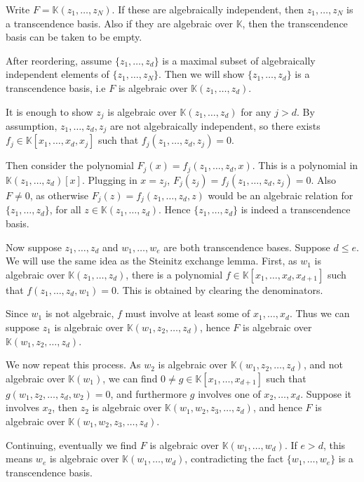 \documentclass[12pt]{article}
\begin{document}
\begin{proofbox}
	Write $F = \mathbb{K}(z_1, \ldots, z_N)$. If these are algebraically independent, then $z_1, \ldots, z_N$ is a transcendence basis. Also if they are algebraic over $\mathbb{K}$, then the transcendence basis can be taken to be empty.
	
	After reordering, assume $\{z_1, \ldots, z_d\}$ is a maximal subset of algebraically independent elements of $\{z_1, \ldots, z_N\}$. Then we will show $\{z_1, \ldots, z_d\}$ is a transcendence basis, i.e $F$ is algebraic over $\mathbb{K}(z_1, \ldots, z_d)$.

	It is enough to show $z_j$ is algebraic over $\mathbb{K}(z_1, \ldots, z_d)$ for any $j > d$. By assumption, $z_1, \ldots, z_d, z_j$ are not algebraically independent, so there exists $f_j \in \mathbb{K}[x_1, \ldots, x_d, x_j]$ such that $f_j(z_1, \ldots, z_d, z_j) = 0$.

	Then consider the polynomial $F_j(x) = f_j(z_1, \ldots, z_d, x)$. This is a polynomial in $\mathbb{K}(z_1, \ldots, z_d)[x]$. Plugging in $x = z_j$, $F_j(z_j) = f_j(z_1, \ldots, z_d, z_j) = 0$. Also $F \neq 0$, as otherwise $F_j(z) = f_j(z_1, \ldots, z_d, z)$ would be an algebraic relation for $\{z_1, \ldots, z_d\}$, for all $z \in \mathbb{K}(z_1, \ldots, z_d)$. Hence $\{z_1, \ldots, z_d\}$ is indeed a transcendence basis.

	Now suppose $z_1, \ldots, z_d$ and $w_1, \ldots, w_e$ are both transcendence bases. Suppose $d \leq e$. We will use the same idea as the Steinitz exchange lemma. First, as $w_1$ is algebraic over $\mathbb{K}(z_1, \ldots, z_d)$, there is a polynomial $f \in \mathbb{K}[x_1, \ldots, x_d, x_{d+1}]$ such that $f(z_1, \ldots, z_d, w_1) = 0$. This is obtained by clearing the denominators.

	Since $w_1$ is not algebraic, $f$ must involve at least some of $x_1, \ldots, x_d$. Thus we can suppose $z_1$ is algebraic over $\mathbb{K}(w_1, z_2, \ldots, z_d)$, hence $F$ is algebraic over $\mathbb{K}(w_1, z_2, \ldots, z_d)$.

	We now repeat this process. As $w_2$ is algebraic over $\mathbb{K}(w_1, z_2, \ldots, z_d)$, and not algebraic over $\mathbb{K}(w_1)$, we can find $0 \neq g \in \mathbb{K}[x_1, \ldots, x_{d+1}]$ such that $g(w_1, z_2, \ldots, z_d, w_2) = 0$, and furthermore $g$ involves one of $x_2, \ldots, x_d$. Suppose it involves $x_2$, then $z_2$ is algebraic over $\mathbb{K}(w_1, w_2, z_3, \ldots, z_d)$, and hence $F$ is algebraic over $\mathbb{K}(w_1, w_2, z_3, \ldots, z_d)$.

	Continuing, eventually we find $F$ is algebraic over $\mathbb{K}(w_1, \ldots, w_d)$. If $e > d$, this means $w_e$ is algebraic over $\mathbb{K}(w_1, \ldots, w_d)$, contradicting the fact $\{w_1, \ldots, w_e\}$ is a transcendence basis.
\end{proofbox}
\end{document}
